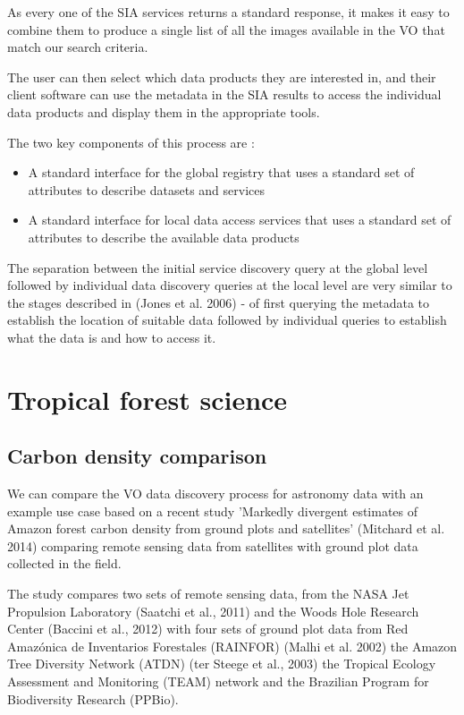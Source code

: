 \documentclass{article}
\begin{document}
As every one of the SIA services returns a standard response, it makes it easy
to combine them to produce a single list of all the images available in the VO
that match our search criteria.

The user can then select which data products they are interested in, and their
client software can use the metadata in the SIA results to access the individual
data products and display them in the appropriate tools.

\noindent
The two key components of this process are :
\begin{itemize}
  \item A standard interface for the global registry that uses a standard set of
  attributes to describe datasets and services
  \item A standard interface for local data access services that uses a standard
  set of attributes to describe the available data products
\end{itemize}

The separation between the initial service discovery query at the global
level followed by individual data discovery queries at the local level
are very similar to the stages described in (Jones et al. 2006) - of first
querying the metadata to establish the location of suitable data followed
by individual queries to establish what the data is and how to access it.

\section{Tropical forest science}

\subsection{Carbon density comparison}

We can compare the VO data discovery process for astronomy data with an example
use case based on a recent study 'Markedly divergent estimates of Amazon forest
carbon density from ground plots and satellites' (Mitchard et al. 2014)
comparing remote sensing data from satellites with ground plot data collected
in the field.

The study compares two sets of remote sensing data, from
the NASA Jet Propulsion Laboratory
(Saatchi et al., 2011)
and the Woods Hole Research Center
(Baccini et al., 2012)
with four sets of ground plot data from
Red Amazónica de Inventarios Forestales (RAINFOR) (Malhi et al. 2002)
the Amazon Tree Diversity Network (ATDN) (ter Steege et al., 2003)
the Tropical Ecology Assessment and Monitoring (TEAM)
network and the
Brazilian Program for Biodiversity Research
(PPBio).
\end{document}
